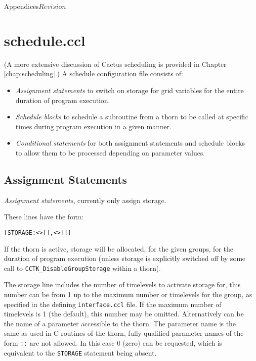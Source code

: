 \begin{cactuspart}{Appendices}{}{$Revision$}
\section{schedule.ccl}
\label{sec:Appendix.schedule}

(A more extensive discussion of Cactus scheduling is provided in Chapter
\ref{chap:scheduling}.)
A schedule configuration file consists of:
\begin{itemize}

\item{} \textit{Assignment statements} to switch on storage for
  grid variables for the entire duration of program execution.

\item{} \textit{Schedule blocks} to schedule a subroutine from a thorn
  to be called at specific times during program execution in a given manner.

\item {} \textit{Conditional statements} for both assignment statements and
  schedule blocks to allow them to be processed depending on parameter values.

\end{itemize}

\subsection{Assignment Statements}

\textit{Assignment statements}, currently only assign storage.

These lines have the form:
\begin{alltt}
[STORAGE: <>[], <>[]]
\end{alltt}

If the thorn is active, storage will be allocated, for the given groups,
for the duration of program execution (unless storage is explicitly
switched off by some call to {\tt CCTK\_DisableGroupStorage} within a
thorn). 

The storage line includes the number of timelevels to activate storage
for, this number can be from 1 up to the maximum number or timelevels
for the group, as specified in the defining {\tt interface.ccl}
file. If the maximum number of timelevels is 1 (the default), this
number may be omitted. Alternatively  can be the name of a
parameter accessible to the thorn. The parameter name is the same as used in C
routines of the thorn, fully qualified parameter names of the form
\texttt{::} are not allowed. In this case 0 (zero)
 can be requested, which is equivalent to the {\tt STORAGE}
statement being absent.


\end{cactuspart}
